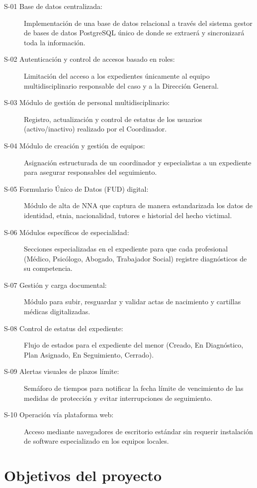 \begin{description}
	\item[S-01 Base de datos centralizada:] Implementación de una base de datos relacional a través del sistema gestor de bases de datos PostgreSQL único de donde se extraerá y sincronizará toda la información.
	\item[S-02 Autenticación y control de accesos basado en roles:] Limitación del acceso a los expedientes únicamente al equipo multidisciplinario responsable del caso y a la Dirección General.
	\item[S-03 Módulo de gestión de personal multidisciplinario:] Registro, actualización y control de estatus de los usuarios (activo/inactivo) realizado por el Coordinador.
	\item[S-04 Módulo de creación y gestión de equipos:] Asignación estructurada de un coordinador y especialistas a un expediente para asegurar responsables del seguimiento.
	\item[S-05 Formulario Único de Datos (FUD) digital:] Módulo de alta de NNA que captura de manera estandarizada los datos de identidad, etnia, nacionalidad, tutores e historial del hecho victimal.
	\item[S-06 Módulos específicos de especialidad:] Secciones especializadas en el expediente para que cada profesional (Médico, Psicólogo, Abogado, Trabajador Social) registre diagnósticos de su competencia.
	\item[S-07 Gestión y carga documental:] Módulo para subir, resguardar y validar actas de nacimiento y cartillas médicas digitalizadas.
	\item[S-08 Control de estatus del expediente:] Flujo de estados para el expediente del menor (Creado, En Diagnóstico, Plan Asignado, En Seguimiento, Cerrado).
	\item[S-09 Alertas visuales de plazos límite:] Semáforo de tiempos para notificar la fecha límite de vencimiento de las medidas de protección y evitar interrupciones de seguimiento.
	\item[S-10 Operación vía plataforma web:] Acceso mediante navegadores de escritorio estándar sin requerir instalación de software especializado en los equipos locales.
\end{description}

\section{Objetivos del proyecto}

